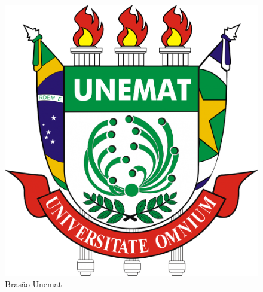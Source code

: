 \begin{figure}[htb]			
	\caption{Brasão Unemat \label{fig_Cap2_brasaoUnemat}}
	\begin{center}
		\includegraphics[scale=0.1]{./Imagens/Brasao_Unemat.png}
	\end{center}
\end{figure}